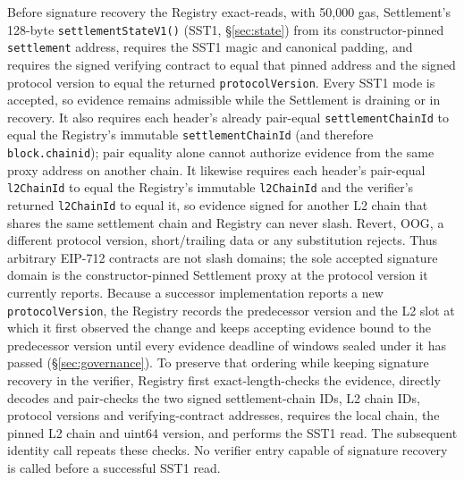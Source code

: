 \documentclass[a4paper,11pt]{article}
\newcommand{\code}[1]{\nolinkurl{#1}}
\begin{document}
Before signature recovery the Registry exact-reads, with 50,000 gas,
Settlement's 128-byte \code{settlementStateV1()} (SST1, \S\ref{sec:state})
from its constructor-pinned \code{settlement} address, requires the SST1
magic and canonical padding, and requires the signed verifying contract to
equal that pinned address and the signed protocol version to equal the
returned \code{protocolVersion}.  Every SST1 mode is accepted, so evidence
remains admissible while the Settlement is draining or in recovery.  It also
requires each header's already pair-equal \code{settlementChainId} to equal
the Registry's immutable \code{settlementChainId} (and therefore
\code{block.chainid}); pair equality alone cannot authorize evidence from the
same proxy address on another chain.  It likewise requires each header's
pair-equal \code{l2ChainId} to equal the Registry's immutable
\code{l2ChainId} and the verifier's returned \code{l2ChainId} to equal it,
so evidence signed for another L2 chain that shares the same settlement chain
and Registry can never slash.
Revert, OOG, a different protocol version, short/trailing data or any
substitution rejects.  Thus arbitrary EIP-712 contracts are not slash
domains; the sole accepted signature domain is the constructor-pinned
Settlement proxy at the protocol version it currently reports.  Because a
successor implementation reports a new \code{protocolVersion}, the Registry
records the predecessor version and the L2 slot at which it first observed
the change and keeps accepting evidence bound to the predecessor version until
every evidence deadline of windows sealed under it has passed
(\S\ref{sec:governance}).  To preserve that
ordering while keeping signature recovery in the verifier, Registry first
exact-length-checks the evidence, directly decodes and pair-checks the two
signed settlement-chain IDs, L2 chain IDs, protocol versions and
verifying-contract addresses, requires the local chain, the pinned L2 chain
and uint64 version, and performs the SST1 read.  The subsequent identity call repeats these checks.  No verifier entry
capable of signature recovery is called before a successful SST1 read.
\end{document}
